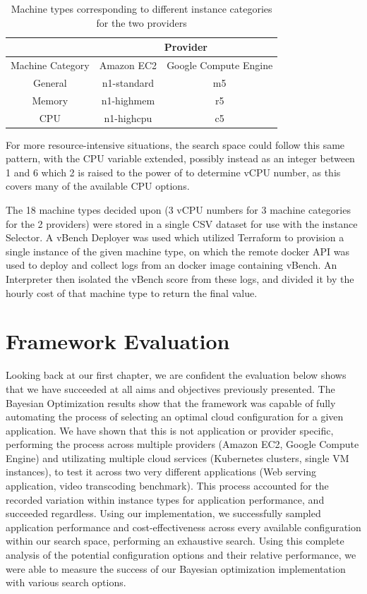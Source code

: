 \documentclass{report}
\begin{document}
\begin{table}[!ht]
\centering
\begin{tabular}{ |c||c|c|  }
 \hline
 & \multicolumn{2}{|c|}{Provider} \\
 \hline
 Machine Category & Amazon EC2 & Google Compute Engine \\
 \hline
 General& n1-standard & m5\\
 Memory & n1-highmem  & r5\\
 CPU    & n1-highcpu  & c5\\
 \hline
\end{tabular}
\caption{Machine types corresponding to different instance categories for the two providers}
\label{tab:instance-types}
\end{table}

For more resource-intensive situations, the search space could follow this same pattern, with the CPU variable extended, possibly instead as an integer between 1 and 6 which 2 is raised to the power of to determine vCPU number, as this covers many of the available CPU options.

The 18 machine types decided upon (3 vCPU numbers for 3 machine categories for the 2 providers) were stored in a single CSV dataset for use with the instance Selector. A vBench Deployer was used which utilized Terraform to provision a single instance of the given machine type, on which the remote docker API was used to deploy and collect logs from an docker image containing vBench. An Interpreter then isolated the vBench score from these logs, and divided it by the hourly cost of that machine type to return the final value.

\section{Framework Evaluation}
Looking back at our first chapter, we are confident the evaluation below shows that we have succeeded at all aims and objectives previously presented. The Bayesian Optimization results show that the framework was capable of fully automating the process of selecting an optimal cloud configuration for a given application. We have shown that this is not application or provider specific, performing the process across multiple providers (Amazon EC2, Google Compute Engine) and utilizating multiple cloud services (Kubernetes clusters, single VM instances), to test it across two very different applications (Web serving application, video transcoding benchmark). This process accounted for the recorded variation within instance types for application performance, and succeeded regardless. 
Using our implementation, we successfully sampled application performance and cost-effectiveness across every available configuration within our search space, performing an exhaustive search. Using this complete analysis of the potential configuration options and their relative performance, we were able to measure the success of our Bayesian optimization implementation with various search options.
\end{document}
